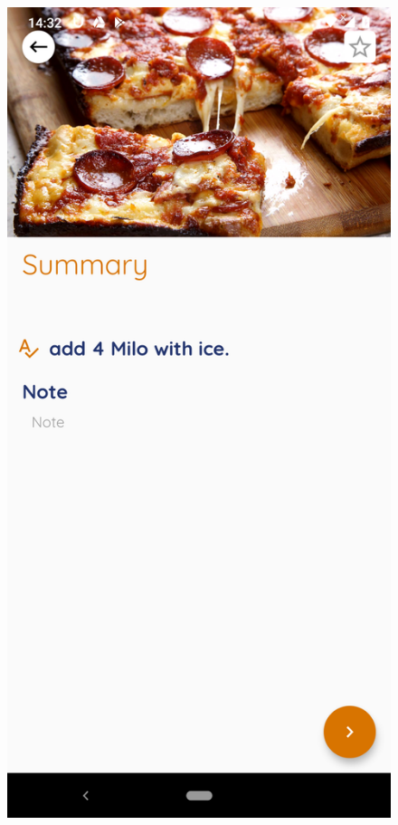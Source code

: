 \documentclass{article}
\begin{document}
\begin{figure}[h!]
    \includegraphics[scale=0.1]{Images/Panpizza_dire.jpg}

\end{figure}
\end{document}
